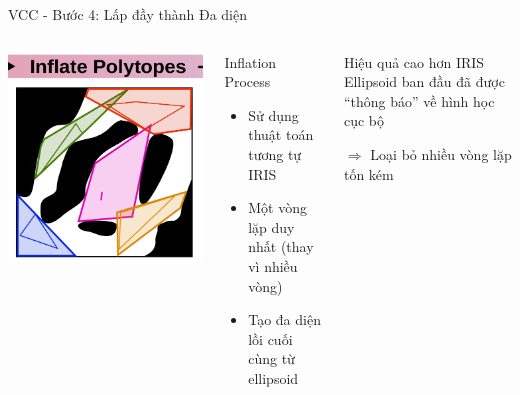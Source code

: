 \documentclass[aspectratio=169]{beamer}
\begin{document}
\begin{frame}{VCC - Bước 4: Lấp đầy thành Đa diện}
    \begin{columns}[c]
        \centering
        \includegraphics[width=\textwidth]{../imgs/VCC-4.png}

        \begin{block}{Inflation Process}
            \small
            \begin{itemize}
                \item Sử dụng thuật toán tương tự IRIS
                \item Một vòng lặp duy nhất (thay vì nhiều vòng)
                \item Tạo đa diện lồi cuối cùng từ ellipsoid
            \end{itemize}
        \end{block}

        \begin{alertblock}{Hiệu quả cao hơn IRIS}
            \small
            Ellipsoid ban đầu đã được ``thông báo'' về hình học cục bộ
            
            \vspace{0.2cm}
            $\Rightarrow$ Loại bỏ nhiều vòng lặp tốn kém
        \end{alertblock}
    \end{columns}
\end{frame}
\end{document}
